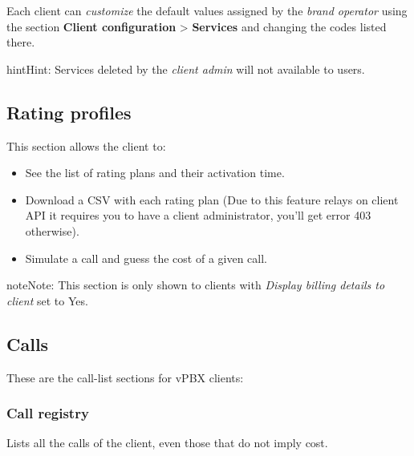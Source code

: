 \documentclass[letterpaper,10pt,english]{sphinxmanual}
\begin{document}
Each client can \emph{customize} the default values assigned by the \emph{brand operator}
using the section \textbf{Client configuration} \textgreater{} \textbf{Services} and changing the codes
listed there.

\begin{notice}{hint}{Hint:}
Services deleted by the \emph{client admin} will not available to users.
\end{notice}


\subsection{Rating profiles}
\label{administration_portal/client/vpbx/rating_profiles:rating-profiles}\label{administration_portal/client/vpbx/rating_profiles::doc}
This section allows the client to:
\begin{itemize}
\item {} 
See the list of rating plans and their activation time.

\item {} 
Download a CSV with each rating plan (Due to this feature relays on client API it requires you to have a client administrator, you'll get error 403 otherwise).

\item {} 
Simulate a call and guess the cost of a given call.

\end{itemize}

\begin{notice}{note}{Note:}
This section is only shown to clients with \emph{Display billing details to client} set to Yes.
\end{notice}


\subsection{Calls}
\label{administration_portal/client/vpbx/calls/index::doc}\label{administration_portal/client/vpbx/calls/index:calls}
These are the call-list sections for vPBX clients:


\subsubsection{Call registry}
\label{administration_portal/client/vpbx/calls/call_registry::doc}\label{administration_portal/client/vpbx/calls/call_registry:call-registry}\label{administration_portal/client/vpbx/calls/call_registry:id1}
Lists all the calls of the client, even those that do not imply cost.
\end{document}
